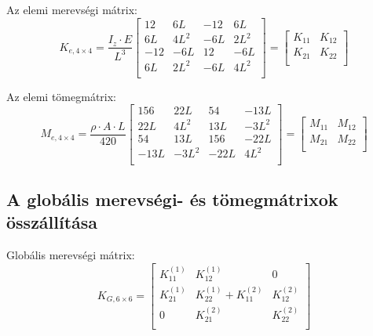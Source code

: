\documentclass{article}
\begin{document}
			Az elemi merevségi mátrix:
			\begin{equation}
				K_{e,4\times4}= \frac{I_{z} \cdot E}{L^3}  
				\begin{bmatrix}
				12&6L&-12&6L\\
				6L&4L^2&-6L&2L^2\\
				-12&-6L&12&-6L\\
				6L&2L^2&-6L&4L^2\\
				\end{bmatrix}
				=\begin{bmatrix}
				K_{11} &K_{12} \\
				K_{21} &K_{22} \\
				\end{bmatrix}
			\end{equation}
	
			Az elemi tömegmátrix:
			\begin{equation}
				M_{e,4\times4}= \frac{\rho \cdot A \cdot L}{420}  
				\begin{bmatrix}
				156&22L&54&-13L\\
				22L&4L^2&13L&-3L^2\\
				54&13L&156&-22L\\
				-13L&-3L^2&-22L&4L^2\\
				\end{bmatrix}
				=\begin{bmatrix}
				M_{11} &M_{12} \\
				M_{21} &M_{22} \\
				\end{bmatrix}
			\end{equation}
	
		\subsection{A globális merevségi- és tömegmátrixok összállítása}
		
			Globális merevségi mátrix:
			\begin{equation}
				K_{G,6\times6}=
				\begin{bmatrix}
				K_{11}^{(1)} & K_{12}^{(1)}              & 0            \\
				K_{21}^{(1)} & K_{22}^{(1)}+K_{11}^{(2)} & K_{12}^{(2)} \\
				0            & K_{21}^{(2)}              & K_{22}^{(2)} \\
				\end{bmatrix}
			\end{equation}
			
\end{document}
